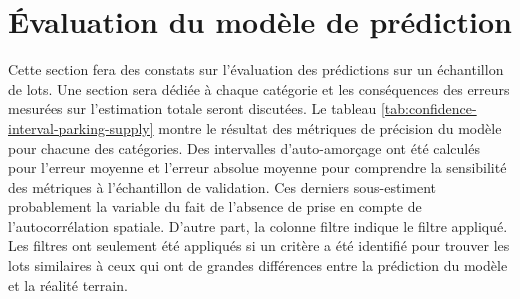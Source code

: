 


\section{Évaluation du modèle de prédiction}\label{sec:eval-park-pred-perf}
Cette section fera des constats sur l'évaluation des prédictions sur un échantillon de lots. Une section sera dédiée à chaque catégorie et les conséquences des erreurs mesurées sur l'estimation totale seront discutées. Le tableau \ref{tab:confidence-interval-parking-supply} montre le résultat des métriques de précision du modèle pour chacune des catégories. Des intervalles d'auto-amorçage ont été calculés pour l'erreur moyenne et l'erreur absolue moyenne pour comprendre la sensibilité des métriques à l'échantillon de validation. Ces derniers sous-estiment probablement la variable du fait de l'absence de prise en compte de l'autocorrélation spatiale. D'autre part, la colonne filtre indique le filtre appliqué. Les filtres ont seulement été appliqués si un critère a été identifié pour trouver les lots similaires à ceux qui ont de grandes différences entre la prédiction du modèle et la réalité terrain.
